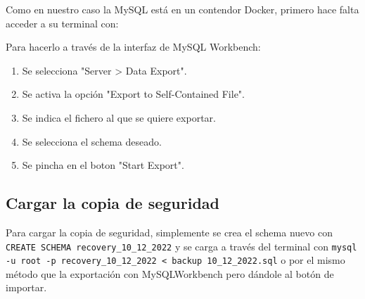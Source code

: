 \documentclass[a4paper, 11pt, oneside]{article} %
\begin{document}
Como en nuestro caso la MySQL está en un contendor Docker, primero hace falta acceder a su terminal con:


Para hacerlo a través de la interfaz de MySQL Workbench:

\begin{enumerate}
	\item Se selecciona "Server > Data Export".
	\item Se activa la opción "Export to Self-Contained File".
	\item Se indica el fichero al que se quiere exportar.
	\item Se selecciona el schema deseado.
	\item Se pincha en el boton "Start Export".
\end{enumerate}

\subsection{Cargar la copia de seguridad}

Para cargar la copia de seguridad, simplemente se crea el schema nuevo con \texttt{CREATE SCHEMA recovery_10_12_2022} y se carga a través del terminal con \texttt{mysql -u root -p recovery_10_12_2022 < backup 10_12_2022.sql} o por el mismo método que la exportación con MySQLWorkbench pero dándole al botón de importar.
\end{document}
